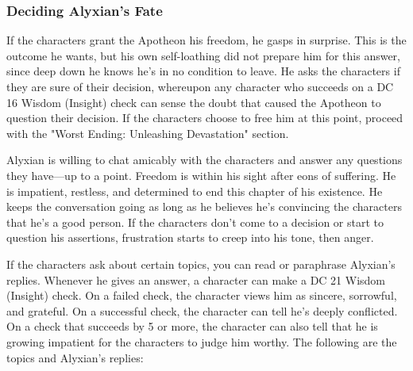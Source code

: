 \documentclass[10pt,a4paper,twoside,twocolumn,openany,nodeprecatedcode]{dndbook}
\begin{document}
\subsubsection{Deciding Alyxian's Fate}
If the characters grant the Apotheon his freedom, he gasps in surprise. This is the outcome he wants, but his own self-loathing did not prepare him for this answer, since deep down he knows he's in no condition to leave. He asks the characters if they are sure of their decision, whereupon any character who succeeds on a DC 16 Wisdom (Insight) check can sense the doubt that caused the Apotheon to question their decision. If the characters choose to free him at this point, proceed with the "Worst Ending: Unleashing Devastation" section.

Alyxian is willing to chat amicably with the characters and answer any questions they have—up to a point. Freedom is within his sight after eons of suffering. He is impatient, restless, and determined to end this chapter of his existence. He keeps the conversation going as long as he believes he's convincing the characters that he's a good person. If the characters don't come to a decision or start to question his assertions, frustration starts to creep into his tone, then anger.

If the characters ask about certain topics, you can read or paraphrase Alyxian's replies. Whenever he gives an answer, a character can make a DC 21 Wisdom (Insight) check. On a failed check, the character views him as sincere, sorrowful, and grateful. On a successful check, the character can tell he's deeply conflicted. On a check that succeeds by 5 or more, the character can also tell that he is growing impatient for the characters to judge him worthy. The following are the topics and Alyxian's replies:
\end{document}
